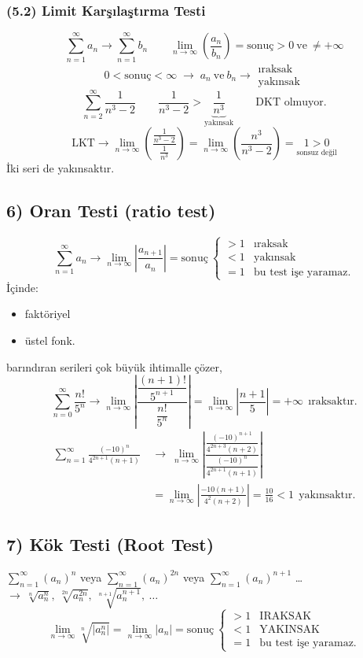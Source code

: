\documentclass[11pt,a4paper]{article}
\begin{document}
\subsubsection{(5.2) Limit Karşılaştırma Testi}
\[ \sum_{n=1}^{\infty}a_n \to \sum_{n=1}^{\infty}b_n \qquad \lim_{n\to\infty}\left(\frac{a_n}{b_n}\right)=\text{sonuç}>0\ \text{ve}\ \neq+\infty \]
\[ 0<\text{sonuç}<\infty \;\to\; a_n\ \text{ve}\ b_n \to \begin{array}{l}\text{ıraksak}\\ \text{yakınsak}\end{array} \]
\[ \sum_{n=2}^{\infty}\frac{1}{n^3-2} \qquad \frac{1}{n^3-2}>\underbrace{\frac{1}{n^3}}_{\text{yakınsak}} \qquad \text{DKT olmuyor.} \]
\[ \text{LKT}\to\lim_{n\to\infty}\left(\frac{\frac{1}{n^3-2}}{\frac{1}{n^3}}\right)=\lim_{n\to\infty}\left(\frac{n^3}{n^3-2}\right)=\underset{\text{sonsuz değil}}{1>0} \]
İki seri de yakınsaktır.

\subsection{6) Oran Testi (ratio test)}
\[ \sum_{n=1}^{\infty}a_n \to \lim_{n\to\infty}\left|\frac{a_{n+1}}{a_n}\right|=\text{sonuç}\ \begin{cases}>1 & \text{ıraksak}\\ <1 & \text{yakınsak}\\ =1 & \text{bu test işe yaramaz.}\end{cases} \]
İçinde:
\begin{itemize}[nosep]
\item faktöriyel
\item üstel fonk.
\end{itemize}
barındıran serileri çok büyük ihtimalle çözer,
\[ \sum_{n=0}^{\infty}\frac{n!}{5^n}\to\lim_{n\to\infty}\left|\frac{\dfrac{(n+1)!}{5^{n+1}}}{\dfrac{n!}{5^n}}\right|=\lim_{n\to\infty}\left|\frac{n+1}{5}\right|=+\infty\ \ \text{ıraksaktır.} \]
\begin{align*}
\sum_{n=1}^{\infty}\frac{(-10)^n}{4^{2n+1}(n+1)}\ &\to\ \lim_{n\to\infty}\left|\frac{\dfrac{(-10)^{n+1}}{4^{2n+3}(n+2)}}{\dfrac{(-10)^n}{4^{2n+1}(n+1)}}\right|\\
&=\lim_{n\to\infty}\left|\frac{-10(n+1)}{4^2(n+2)}\right|=\frac{10}{16}<1\ \ \text{yakınsaktır.}
\end{align*}

\subsection{7) Kök Testi (Root Test)}
$\sum_{n=1}^{\infty}(a_n)^n$ veya $\sum_{n=1}^{\infty}(a_n)^{2n}$ veya $\sum_{n=1}^{\infty}(a_n)^{n+1}$ \dots\ $\to\ \sqrt[n]{a_n^n},\ \sqrt[2n]{a_n^{2n}},\ \sqrt[n+1]{a_n^{n+1}},\ \dots$
\[ \lim_{n\to\infty}\sqrt[n]{|a_n^n|}=\lim_{n\to\infty}|a_n|=\text{sonuç}\ \begin{cases}>1 & \text{IRAKSAK}\\ <1 & \text{YAKINSAK}\\ =1 & \text{bu test işe yaramaz.}\end{cases} \]
\end{document}

